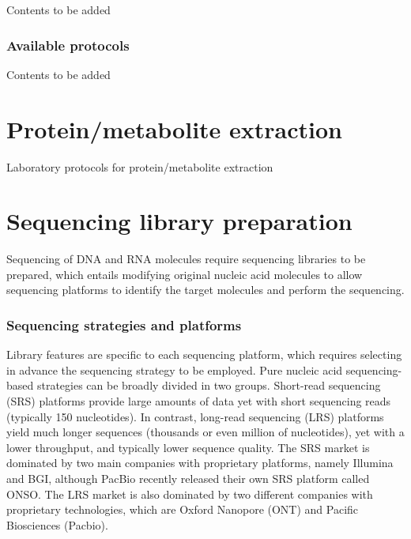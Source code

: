 \documentclass[
]{book}
\begin{document}
Contents to be added

\hypertarget{available-protocols}{%
\subsection*{Available protocols}\label{available-protocols}}

Contents to be added

\hypertarget{protein-metabolite-extraction}{%
\chapter{Protein/metabolite extraction}\label{protein-metabolite-extraction}}

Laboratory protocols for protein/metabolite extraction

\hypertarget{sequencing-library-preparation}{%
\chapter{Sequencing library preparation}\label{sequencing-library-preparation}}

Sequencing of DNA and RNA molecules require sequencing libraries to be prepared, which entails modifying original nucleic acid molecules to allow sequencing platforms to identify the target molecules and perform the sequencing.

\hypertarget{sequencing-strategies-platforms}{%
\subsection*{Sequencing strategies and platforms}\label{sequencing-strategies-platforms}}

Library features are specific to each sequencing platform, which requires selecting in advance the sequencing strategy to be employed. Pure nucleic acid sequencing-based strategies can be broadly divided in two groups. Short-read sequencing (SRS) platforms provide large amounts of data yet with short sequencing reads (typically 150 nucleotides). In contrast, long-read sequencing (LRS) platforms yield much longer sequences (thousands or even million of nucleotides), yet with a lower throughput, and typically lower sequence quality. The SRS market is dominated by two main companies with proprietary platforms, namely Illumina and BGI, although PacBio recently released their own SRS platform called ONSO. The LRS market is also dominated by two different companies with proprietary technologies, which are Oxford Nanopore (ONT) and Pacific Biosciences (Pacbio).
\end{document}
